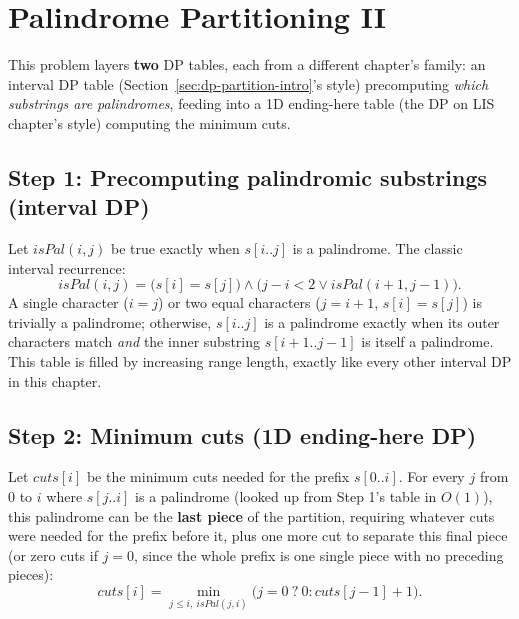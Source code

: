 \section{Palindrome Partitioning II}
\label{sec:dp-palindrome-partitioning-2}


\begin{patternbox}
This problem layers \textbf{two} DP tables, each from a different
chapter's family: an interval DP table (Section~\ref{sec:dp-partition-intro}'s
style) precomputing \emph{which substrings are palindromes}, feeding
into a 1D ending-here table (the DP on LIS chapter's style) computing
the minimum cuts.
\end{patternbox}

\subsection*{Step 1: Precomputing palindromic substrings (interval DP)}

Let $\textit{isPal}(i,j)$ be true exactly when $s[i..j]$ is a
palindrome. The classic interval recurrence:
\[
  \textit{isPal}(i,j) = \big(s[i]=s[j]\big) \land
  \big(j-i<2 \lor \textit{isPal}(i{+}1,j{-}1)\big).
\]
A single character ($i=j$) or two equal characters ($j=i+1$,
$s[i]=s[j]$) is trivially a palindrome; otherwise, $s[i..j]$ is a
palindrome exactly when its outer characters match \emph{and} the
inner substring $s[i{+}1..j{-}1]$ is itself a palindrome. This table is
filled by increasing range length, exactly like every other interval DP
in this chapter.

\subsection*{Step 2: Minimum cuts (1D ending-here DP)}

Let $\textit{cuts}[i]$ be the minimum cuts needed for the prefix
$s[0..i]$. For every $j$ from $0$ to $i$ where $s[j..i]$ is a
palindrome (looked up from Step 1's table in $O(1)$), this palindrome
can be the \textbf{last piece} of the partition, requiring whatever cuts
were needed for the prefix before it, plus one more cut to separate
this final piece (or zero cuts if $j=0$, since the whole prefix is one
single piece with no preceding pieces):
\[
  \textit{cuts}[i] = \min_{j\le i,\ \textit{isPal}(j,i)}
  \big(j=0\ ?\ 0 : \textit{cuts}[j{-}1] + 1\big).
\]

